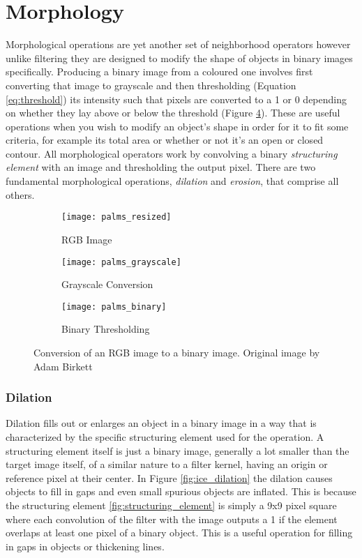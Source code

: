 \section{Morphology}
\label{section:morphology}
Morphological operations are yet another set of neighborhood operators however unlike filtering they are designed to modify the shape of objects in binary images specifically. Producing a binary image from a coloured one involves first converting that image to grayscale and then thresholding (Equation \ref{eq:threshold}) its intensity such that pixels are converted to a 1 or 0 depending on whether they lay above or below the threshold (Figure \ref{fig:thresholding}). These are useful operations when you wish to modify an object's shape in order for it to fit some criteria, for example its total area or whether or not it's an open or closed contour. All morphological operators work by convolving a binary \emph{structuring element} with an image and thresholding the output pixel. There are two fundamental morphological operations, \emph{dilation} and \emph{erosion}, that comprise all others. 

\begin{figure}[htbp]
    \centering
    \begin{subfigure}[b]{0.3\textwidth}
        \texttt{[image: palms\_resized]}
        \caption{RGB Image}
        \label{fig:emu_noise}
    \end{subfigure}
    \begin{subfigure}[b]{0.3\textwidth}
        \texttt{[image: palms\_grayscale]}
        \caption{Grayscale Conversion}
        \label{fig:emu_gauss}
    \end{subfigure}
    \begin{subfigure}[b]{0.3\textwidth}
        \texttt{[image: palms\_binary]}
        \caption{Binary Thresholding}
        \label{fig:emu_median}
    \end{subfigure}
    \captionsetup{format = hang}
    \caption{Conversion of an RGB image to a binary image. Original image by Adam Birkett}
    \label{fig:thresholding}
\end{figure}



\subsubsection{Dilation}

Dilation fills out or enlarges an object in a binary image in a way that is characterized by the specific structuring element used for the operation. A structuring element itself is just a binary image, generally a lot smaller than the target image itself, of a similar nature to a filter kernel, having an origin or reference pixel at their center. In Figure \ref{fig:ice_dilation} the dilation causes objects to fill in gaps and even small spurious objects are inflated. This is because the structuring element \ref{fig:structuring_element} is simply a 9x9 pixel square where each convolution of the filter with the image outputs a 1 if the element overlaps at least one pixel of a binary object. This is a useful operation for filling in gaps in objects or thickening lines.


